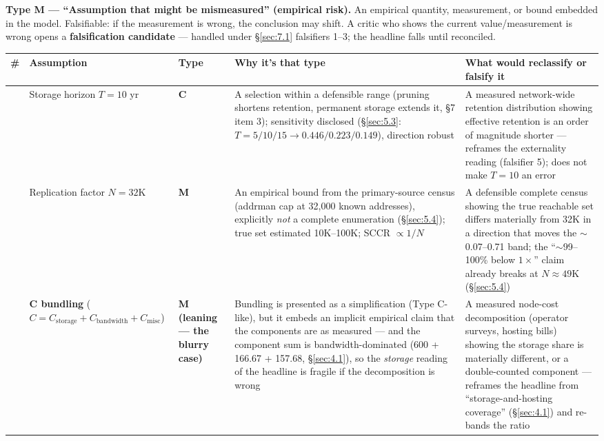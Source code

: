 \documentclass[11pt]{article}
\begin{document}
\textbf{Type M --- ``Assumption that might be mismeasured'' (empirical risk).} An
empirical quantity, measurement, or bound embedded in the model. Falsifiable: if
the measurement is wrong, the conclusion may shift. A critic who shows the
current value/measurement is wrong opens a \textbf{falsification candidate} ---
handled under \S\ref{sec:7.1} falsifiers 1--3; the headline falls until
reconciled.

\begin{table}[h]
\centering
\small
\renewcommand{\arraystretch}{1.3}
\begin{tabular}{@{}>{\raggedright\arraybackslash}p{0.7cm}>{\raggedright\arraybackslash}p{2.9cm}>{\raggedright\arraybackslash}p{2.0cm}>{\raggedright\arraybackslash}p{5.3cm}>{\raggedright\arraybackslash}p{5.0cm}@{}}
\toprule
\textbf{\#} & \textbf{Assumption} & \textbf{Type} & \textbf{Why it's that type} & \textbf{What would reclassify or falsify it}\\
\midrule
1 & Storage horizon $T = 10$ yr & \textbf{C} & A selection within a defensible range (pruning shortens retention, permanent storage extends it, \S7 item 3); sensitivity disclosed (\S\ref{sec:5.3}: $T=5/10/15 \rightarrow 0.446/0.223/0.149$), direction robust & A measured network-wide retention distribution showing effective retention is an order of magnitude shorter --- reframes the externality reading (falsifier 5); does not make $T=10$ an error\\
2 & Replication factor $N = 32$K & \textbf{M} & An empirical bound from the primary-source census (addrman cap at 32{,}000 known addresses), explicitly \emph{not} a complete enumeration (\S\ref{sec:5.4}); true set estimated 10K--100K; SCCR $\propto 1/N$ & A defensible complete census showing the true reachable set differs materially from 32K in a direction that moves the $\sim$0.07--0.71 band; the ``$\sim$99--100\% below $1\times$'' claim already breaks at $N \approx 49$K (\S\ref{sec:5.4})\\
3 & \textbf{C bundling} ($C = C_{\mathrm{storage}} + C_{\mathrm{bandwidth}} + C_{\mathrm{misc}}$) & \textbf{M (leaning --- the blurry case)} & Bundling is presented as a simplification (Type C-like), but it embeds an implicit empirical claim that the components are as measured --- and the component sum is bandwidth-dominated (600 + 166.67 + 157.68, \S\ref{sec:4.1}), so the \emph{storage} reading of the headline is fragile if the decomposition is wrong & A measured node-cost decomposition (operator surveys, hosting bills) showing the storage share is materially different, or a double-counted component --- reframes the headline from ``storage-and-hosting coverage'' (\S\ref{sec:4.1}) and re-bands the ratio\\

\end{tabular}
\end{table}
\end{document}
